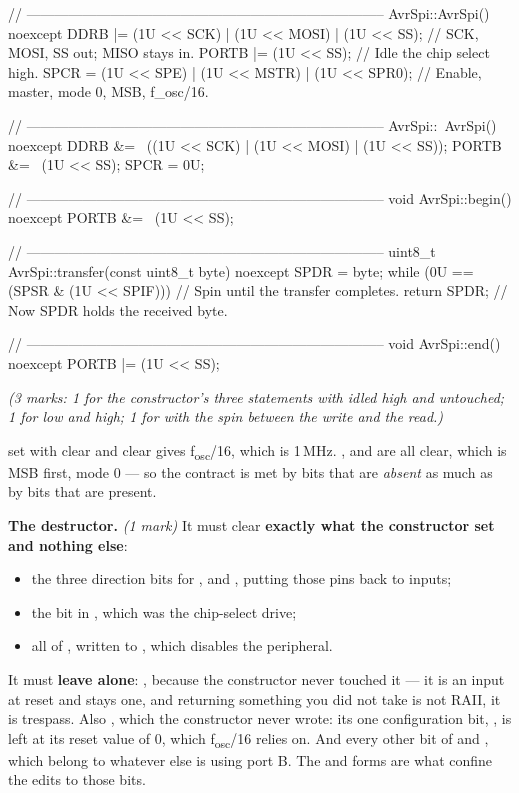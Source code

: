 \begin{cppcode}
// -----------------------------------------------------------------------------
AvrSpi::AvrSpi() noexcept
{
    DDRB |= (1U << SCK) | (1U << MOSI) | (1U << SS);   // SCK, MOSI, SS out; MISO stays in.
    PORTB |= (1U << SS);                               // Idle the chip select high.
    SPCR = (1U << SPE) | (1U << MSTR) | (1U << SPR0);  // Enable, master, mode 0, MSB, f_osc/16.
}

// -----------------------------------------------------------------------------
AvrSpi::~AvrSpi() noexcept
{
    DDRB &= ~((1U << SCK) | (1U << MOSI) | (1U << SS));
    PORTB &= ~(1U << SS);
    SPCR = 0U;
}

// -----------------------------------------------------------------------------
void AvrSpi::begin() noexcept { PORTB &= ~(1U << SS); }

// -----------------------------------------------------------------------------
uint8_t AvrSpi::transfer(const uint8_t byte) noexcept
{
    SPDR = byte;
    while (0U == (SPSR & (1U << SPIF))) {}   // Spin until the transfer completes.
    return SPDR;                             // Now SPDR holds the received byte.
}

// -----------------------------------------------------------------------------
void AvrSpi::end() noexcept { PORTB |= (1U << SS); }
\end{cppcode}

{\itshape (3 marks: 1 for the constructor's three statements with  idled high and
 untouched; 1 for  low and  high; 1 for  with
the  spin between the write and the read.)\par}

\medskip
{} set with  clear and  clear gives f\textsubscript{osc}/16, which is
1\,MHz. ,  and  are all clear, which is MSB first, mode 0 --- so the
contract is met by bits that are \emph{absent} as much as by bits that are present.

\textbf{The destructor.} \textit{(1 mark)} It must clear \textbf{exactly what the constructor set
and nothing else}:
\begin{itemize}
  \item the three  direction bits for ,  and , putting
    those pins back to inputs;
  \item the  bit in , which was the chip-select drive;
  \item all of , written to , which disables the peripheral.
\end{itemize}
It must \textbf{leave alone}: , because the constructor never touched it --- it is an
input at reset and stays one, and returning something you did not take is not RAII, it is trespass.
Also , which the constructor never wrote: its one configuration bit, , is left
at its reset value of 0, which f\textsubscript{osc}/16 relies on. And every other bit of 
and , which belong to whatever else is using port B. The \code{&=} and \code{|=} forms
are what confine the edits to those bits.

